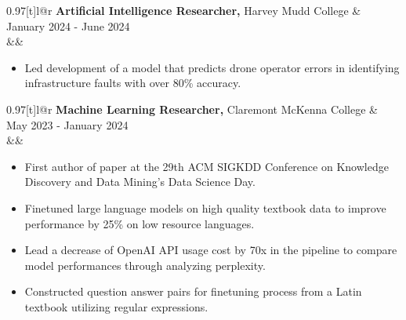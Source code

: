 \documentclass[letterpaper,10pt]{article}
\makeatletter
\newcommand{\resumeItem}[1]{
  \item[$\bullet$]\small{
    {#1 \vspace{-2pt}}
  }
}
\newcommand{\jobSubheading}[4]{
  \vspace{-2pt}\item
  \begin{tabular*}{0.97\textwidth}[t]{l@{\extracolsep{\fill}}r}
    \textbf{#1,} #3 & #2 \\
    \ifx&#4&\else\small#4\fi
  \end{tabular*}\vspace{-5pt}
}
\makeatother
\begin{document}


      \jobSubheading
        {Artificial Intelligence Researcher}{January 2024 - June 2024}
        {Harvey Mudd College}{}
        \begin{itemize}\small
        \setlength\itemsep{0em}
            \resumeItem{ Led development of a model that predicts drone operator errors in identifying infrastructure faults with over 80\% accuracy.}
        \end{itemize}

        \jobSubheading
        {Machine Learning Researcher}{May 2023 - January 2024}
        {Claremont McKenna College}{}
        \begin{itemize}\small
        \setlength\itemsep{0em}
            \resumeItem{ First author of paper at the 29th ACM SIGKDD Conference on Knowledge Discovery and Data Mining’s Data Science Day.}
            \resumeItem{ Finetuned large language models on high quality textbook data to improve performance by 25\% on low resource languages. }
            \resumeItem{ Lead a decrease of OpenAI API usage cost by 70x in the pipeline to compare model performances through analyzing perplexity. }
            \resumeItem{Constructed question answer pairs for finetuning process from a Latin textbook utilizing regular expressions.}
        \end{itemize}
\end{document}
